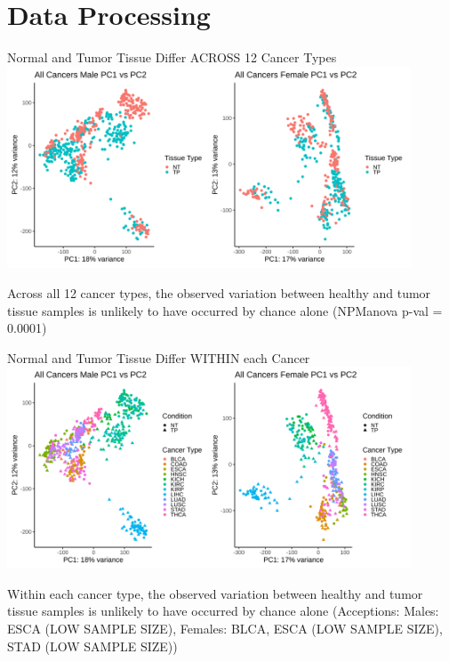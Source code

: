 \documentclass{beamer}
\begin{document}
	\section{Data Processing}
	\begin{frame}{Normal and Tumor Tissue Differ ACROSS 12 Cancer Types}
		\includegraphics[width=12cm, height=6cm]{all_cancerspca_analysis_condition_0.9.png}
		
		Across all 12 cancer types, the observed variation between healthy and tumor tissue samples is unlikely to have occurred by chance alone (NPManova p-val = 0.0001)
	\end{frame}

	\begin{frame}{Normal and Tumor Tissue Differ WITHIN each Cancer}
		\includegraphics[width=12cm, height=6cm]{all_cancerspca_analysis_condition_cancertype_0.9.png}
		
		Within each cancer type, the observed variation between healthy and tumor tissue samples is unlikely to have occurred by chance alone (Acceptions: Males: ESCA (LOW SAMPLE SIZE), Females: BLCA, ESCA (LOW SAMPLE SIZE), STAD (LOW SAMPLE SIZE))
	\end{frame}
\end{document}
